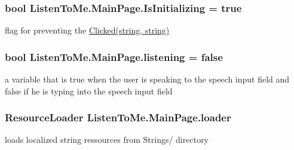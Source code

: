 \subsubsection[{\texorpdfstring{Is\+Initializing}{IsInitializing}}]{\setlength{\rightskip}{0pt plus 5cm}bool Listen\+To\+Me.\+Main\+Page.\+Is\+Initializing = true\hspace{0.3cm}{\ttfamily [private]}}\hypertarget{class_listen_to_me_1_1_main_page_a448f51804566fe32efca61994caf9ab9}{}\label{class_listen_to_me_1_1_main_page_a448f51804566fe32efca61994caf9ab9}


flag for preventing the \hyperlink{class_listen_to_me_1_1_main_page_a465e7f9723aec19e912a3913841d477e}{Clicked(string, string)} 

\subsubsection[{\texorpdfstring{listening}{listening}}]{\setlength{\rightskip}{0pt plus 5cm}bool Listen\+To\+Me.\+Main\+Page.\+listening = false\hspace{0.3cm}{\ttfamily [private]}}\hypertarget{class_listen_to_me_1_1_main_page_ad46f69d6d70b9b13b74b4013b86ca608}{}\label{class_listen_to_me_1_1_main_page_ad46f69d6d70b9b13b74b4013b86ca608}


a variable that is true when the user is speaking to the speech input field and false if he is typing into the speech input field 

\subsubsection[{\texorpdfstring{loader}{loader}}]{\setlength{\rightskip}{0pt plus 5cm}Resource\+Loader Listen\+To\+Me.\+Main\+Page.\+loader\hspace{0.3cm}{\ttfamily [private]}}\hypertarget{class_listen_to_me_1_1_main_page_a906eb7f1e61084dcfb0b0f833b0d96f4}{}\label{class_listen_to_me_1_1_main_page_a906eb7f1e61084dcfb0b0f833b0d96f4}


loads localized string ressources from Strings/ directory 

